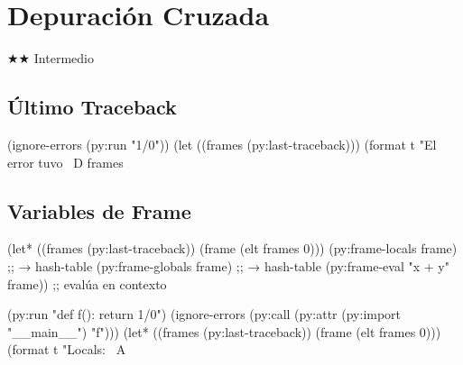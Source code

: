 \chapter{Depuración Cruzada}
\label{chap:cross-debugging}
{\huge$\bigstar$}{\huge$\bigstar$} Intermedio

\section{Último Traceback}
\begin{lispcode}
(ignore-errors (py:run "1/0"))
(let ((frames (py:last-traceback)))
  (format t "El error tuvo ~D frames~%
\end{lispcode}

\section{Variables de Frame}
\begin{lispcode}
(let* ((frames (py:last-traceback))
       (frame (elt frames 0)))
  (py:frame-locals frame)     ;; → hash-table
  (py:frame-globals frame)    ;; → hash-table
  (py:frame-eval "x + y" frame))  ;; evalúa en contexto
\end{lispcode}

\begin{examplebox}[title=Inspección completa de error Python]
\begin{lispcode}
(py:run "def f(): return 1/0")
(ignore-errors (py:call (py:attr (py:import "__main__") "f")))
(let* ((frames (py:last-traceback))
       (frame (elt frames 0)))
  (format t "Locals: ~A~%
\end{lispcode}
\end{examplebox}


